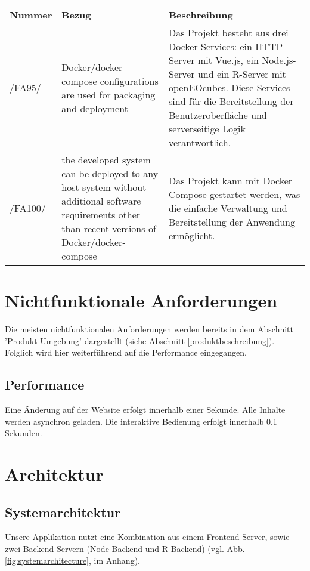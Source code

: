 \documentclass[a4paper,12pt]{article}
\newcommand{\addrow}[3]{#1 &#2 &#3 \\ [0.2cm]}
\newcommand{\addheading}[3]{#1 &#2 &#3\\ \hline }
\newcommand{\tabularhead}{\begin{tabular}{l p{5cm} p{8cm}}
\hline
}
\newenvironment{usecase}{\tabularhead}
{\hline\end{tabular}}
\begin{document}
\begin{usecase}

  \addheading{Nummer}{Bezug}{Beschreibung} 
  \addrow{/FA95/}{Docker/docker-compose configurations are used for packaging and deployment}{Das Projekt besteht aus drei Docker-Services: ein HTTP-Server mit Vue.js, ein Node.js-Server und ein R-Server mit openEOcubes. Diese Services sind für die Bereitstellung der Benutzeroberfläche und  serverseitige Logik verantwortlich.}
  \addrow{/FA100/}{the developed system can be deployed to any host system without additional
software requirements other than recent versions of Docker/docker-compose}{Das Projekt kann mit Docker Compose gestartet werden, was die einfache Verwaltung und Bereitstellung der Anwendung ermöglicht.}

\end{usecase}

\section{Nichtfunktionale Anforderungen}
Die meisten nichtfunktionalen Anforderungen werden bereits in dem Abschnitt 'Produkt-Umgebung' dargestellt (siehe Abschnitt \ref{produktbeschreibung}). Folglich wird hier weiterführend auf die Performance eingegangen.
\subsection{Performance}
Eine Änderung auf der Website erfolgt innerhalb einer Sekunde. Alle Inhalte werden asynchron geladen. Die interaktive Bedienung erfolgt innerhalb 0.1 Sekunden.


\section{Architektur}


\subsection{Systemarchitektur} \label{chpt:systemarchitecture}
Unsere Applikation nutzt eine Kombination aus einem Frontend-Server, sowie zwei Backend-Servern (Node-Backend und R-Backend) (vgl. Abb. \ref{fig:systemarchitecture}, im Anhang).
\end{document}
